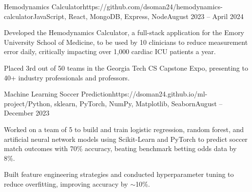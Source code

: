 \documentclass{article}
\begin{document}
\begin{flushleft}

    \vspace{3pt}

    \begin{project}{Hemodynamics Calculator}{https://github.com/dsoman24/hemodynamics-calculator}{JavaScript, React, MongoDB, Express, Node}{August 2023 -- April 2024}
        \item Developed the Hemodynamics Calculator, a full-stack application for the Emory University School of Medicine, to be used by 10 clinicians to reduce measurement error daily, critically impacting over 1,000 cardiac ICU patients a year.
        \item Placed 3rd out of 50 teams in the Georgia Tech CS Capstone Expo, presenting to 40+ industry professionals and professors.
    \end{project}

    \begin{project}{Machine Learning Soccer Prediction}{https://dsoman24.github.io/ml-project/}{Python, sklearn, PyTorch, NumPy, Matplotlib, Seaborn}{August -- December 2023}
        \item Worked on a team of 5 to build and train logistic regression, random forest, and artificial neural network models using Scikit-Learn and PyTorch to predict soccer match outcomes with 70\% accuracy, beating benchmark betting odds data by 8\%.
        \item Built feature engineering strategies and conducted hyperparameter tuning to reduce overfitting, improving accuracy by $\sim$10\%.
    \end{project}


    \vspace{3pt}
     \\
     \\
     \\
\end{flushleft}
\end{document}
